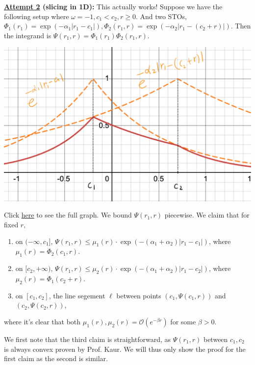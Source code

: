 \documentclass[12pt]{article}
\begin{document}
\textbf{\underline{Attempt 2} (slicing in 1D):} This actually works!
Suppose we have the following setup where \(\omega = -1, c_1 < c_2, r \geq 0\). And two STOs, \(\Phi_1(r_1) = \exp(-\alpha_1|r_1-c_1|), \Phi_2(r_1,r) = \exp(-\alpha_2|r_1 - (c_2 + r)|)\).
Then the integrand is \(\Psi(r_1,r) = \Phi_1(r_1) \Phi_2(r_1,r)\). 

\begin{center}
    \includegraphics[scale=0.21]{figure1.jpeg}
\end{center}
Click \href{https://www.desmos.com/calculator/zuqivaujt4}{\underline{here}} to see the full graph.
We bound \(\Psi(r_1,r)\) piecewise. We claim that for fixed \(r\),
\begin{enumerate}
    \item on \((-\infty, c_1]\), \(\Psi(r_1,r) \leq \mu_1(r) \cdot \exp(-(\alpha_1 + \alpha_2)|r_1-c_1|)\), where \(\mu_1(r) = \Phi_2(c_1,r)\).
    \item on \([c_2,+\infty)\), \(\Psi(r_1,r) \leq \mu_2(r) \cdot \exp(-(\alpha_1 + \alpha_2)|r_1-c_2|)\), where \(\mu_2(r) = \Phi_1(c_2+r).\)
    \item on \([c_1,c_2]\), the line segement \(\ell\) between points \((c_1, \Psi(c_1,r))\) and \((c_2, \Psi(c_2,r))\),
\end{enumerate}
where it's clear that both \(\mu_1(r), \mu_2(r) = \mathcal{O}(e^{-\beta r})\) for some \(\beta > 0\).

We first note that the third claim is straightforward, as \(\Psi(r_1,r)\) between \(c_1,c_2\) is always convex proven by Prof. Kaur. We will thus only show the proof for the first claim as the second is similar.
\end{document}
